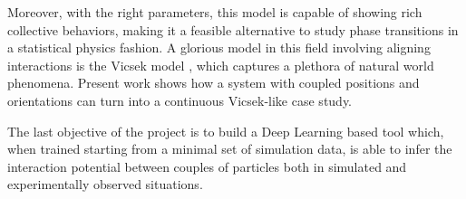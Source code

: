 \documentclass[../main.tex]{subfiles}
\begin{document}
	Moreover, with the right parameters, this model is capable of showing rich collective behaviors, making it a feasible alternative to study phase transitions in a statistical physics fashion. A glorious model in this field involving aligning interactions is the Vicsek model \parencite{vicsek_novel_1995}, which captures a plethora of natural world phenomena. Present work shows how a system with coupled positions and orientations can turn into a continuous Vicsek-like case study.
	
	The last objective of the project is to build a Deep Learning based tool which, when trained starting from a minimal set of simulation data, is able to infer the interaction potential between couples of particles both in simulated and experimentally observed situations.
	
	\begin{comment}
			\section{Passive Brownian Motion}
		Before adding the self-propulsion velocity, it is worthwhile to outline some facts about Passive Brownian motion in a 2-dimensional environment.
		Due to the collisions with the fluid molecules, a passive Brownian particle experiences random forces and torques so that its motion is purely diffusive, both in position and orientation with the following diffusion coefficients
		\begin{equation}
			D_t = \frac{k_B T}{\gamma_t} \quad D_r = \frac{k_B T}{\gamma_r} 
		\end{equation}
		
		being $\gamma_t = 6 \pi \eta a$ and $\gamma_r = 8 \pi \eta a^3$  the respective drag coefficients, where $a$ is the particle radius and $\eta$ is the fluid viscosity. The basis to build the model upon is the Langevin equation
		
		\begin{equation} \label{eq:lang1}
			m \mathbf{\ddot{r}} = -\gamma_t \mathbf{\dot{r}} + \mathbf{F}_{th}
		\end{equation} 
		
		where $\mathbf{F}_{th}$ is the random force given by the collisions with the fluid molecules.
		

\end{comment}
\end{document}
